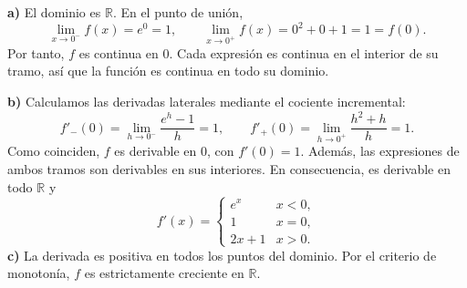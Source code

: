 \textbf{a)} El dominio es $\mathbb R$. En el punto de unión,
\[
 \lim_{x\to0^-}f(x)=e^0=1,\qquad
 \lim_{x\to0^+}f(x)=0^2+0+1=1=f(0).
\]
Por tanto, $f$ es continua en $0$. Cada expresión es continua en el interior de su tramo, así que la función es continua en todo su dominio.

\textbf{b)} Calculamos las derivadas laterales mediante el cociente incremental:
\[
 f'_-(0)=\lim_{h\to0^-}\frac{e^h-1}{h}=1,
 \qquad
 f'_+(0)=\lim_{h\to0^+}\frac{h^2+h}{h}=1.
\]
Como coinciden, $f$ es derivable en $0$, con $f'(0)=1$. Además, las expresiones de ambos tramos son derivables en sus interiores. En consecuencia, es derivable en todo $\mathbb R$ y
\[
 f'(x)=\begin{cases}e^x&x<0,\\1&x=0,\\2x+1&x>0.\end{cases}
\]
\textbf{c)} La derivada es positiva en todos los puntos del dominio. Por el criterio de monotonía, $f$ es estrictamente creciente en $\mathbb R$.

